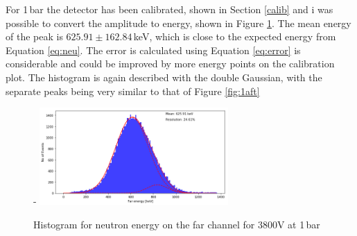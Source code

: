 \documentclass[a4paper]{article}
\begin{document}
\newline For 1\,bar the detector has been calibrated, shown in Section \ref{calib} and i was possible to convert the amplitude to energy, shown in Figure \ref{fig:1ev}. The mean energy of the peak is $625.91 \pm 162.84$\,keV, which is close to the expected energy from Equation \ref{eq:neu}. The error is calculated using Equation \ref{eq:error} is considerable and could be improved by more energy points on the calibration plot. The histogram is again described with the double Gaussian, with the separate peaks being very similar to that of Figure \ref{fig:1aft}
\begin{figure}[H]- 
    \centering
    \includegraphics[height=3.7cm]{uk24n001_ev.png}
    \caption{Histogram for neutron energy on the far channel for 3800V at 1\,bar}
    \label{fig:1ev}
\end{figure}
\end{document}
